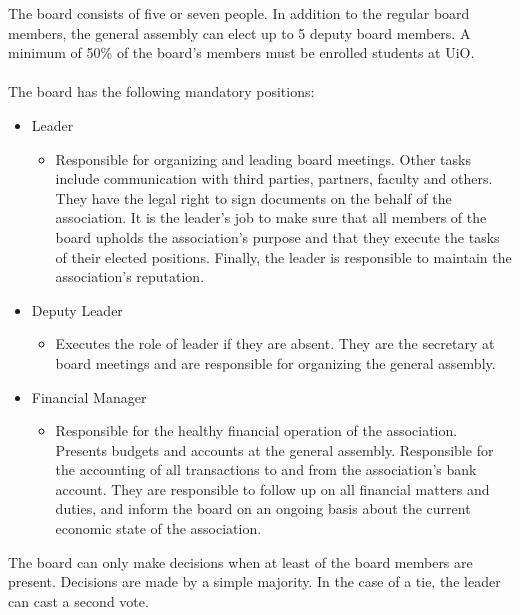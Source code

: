 \documentclass[12pt,a4paper,norsk]{article}
\begin{document}
The board consists of five or seven people. In addition to the regular board members, the general assembly can elect up to 5 deputy board members. A minimum of 50\% of the board's members must be enrolled students at UiO.
\\
\\
The board has the following mandatory positions:
\begin{itemize}
    \item Leader
    \begin{itemize}
        \item Responsible for organizing and leading board meetings. Other tasks include communication with third parties, partners, faculty and others. They have the legal right to sign documents on the behalf of the association. It is the leader's job to make sure that all members of the board upholds the association's purpose and that they execute the tasks of their elected positions. Finally, the leader is responsible to maintain the association's reputation.
    \end{itemize}

    \item Deputy Leader
    \begin{itemize}
        \item Executes the role of leader if they are absent. They are the secretary at board meetings and are responsible for organizing the general assembly.
    \end{itemize}

    \item Financial Manager
    \begin{itemize}
        \item Responsible for the healthy financial operation of the association. Presents budgets and accounts at
         the general assembly. Responsible for the accounting of all transactions to and from the association's bank account. They are responsible to follow up on all financial matters and duties, and inform the board on an ongoing basis about the current economic state of the association.
    \end{itemize}
\end{itemize}
The board can only make decisions when at least  of the board members are present. Decisions are made by a simple majority. In the case of a tie, the leader can cast a second vote.
\end{document}
